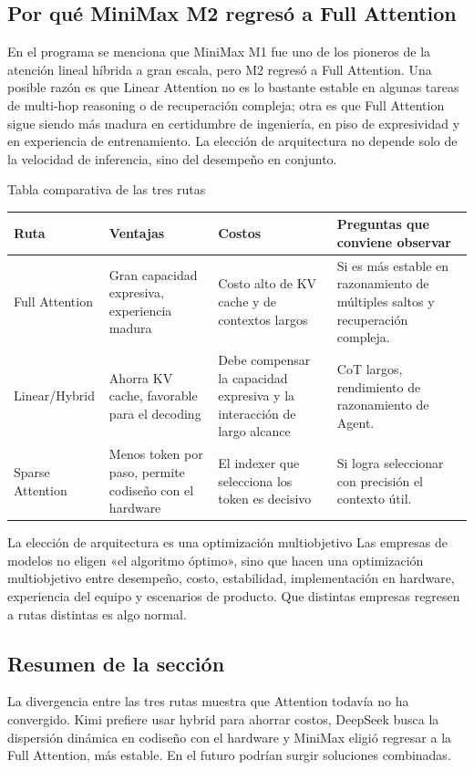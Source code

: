 \subsection{Por qué MiniMax M2 regresó a Full Attention}

En el programa se menciona que MiniMax M1 fue uno de los pioneros de la atención lineal híbrida a gran escala, pero M2 regresó a Full Attention. Una posible razón es que Linear Attention no es lo bastante estable en algunas tareas de multi-hop reasoning o de recuperación compleja; otra es que Full Attention sigue siendo más madura en certidumbre de ingeniería, en piso de expresividad y en experiencia de entrenamiento. La elección de arquitectura no depende solo de la velocidad de inferencia, sino del desempeño en conjunto.

\begin{knowledgebox}{Tabla comparativa de las tres rutas}
\begin{tabularx}{\textwidth}{p{}p{}p{}X}
\toprule
Ruta & Ventajas & Costos & Preguntas que conviene observar \\
\midrule
Full Attention & Gran capacidad expresiva, experiencia madura & Costo alto de KV cache y de contextos largos & Si es más estable en razonamiento de múltiples saltos y recuperación compleja. \\
Linear/Hybrid & Ahorra KV cache, favorable para el decoding & Debe compensar la capacidad expresiva y la interacción de largo alcance & CoT largos, rendimiento de razonamiento de Agent. \\
Sparse Attention & Menos token por paso, permite codiseño con el hardware & El indexer que selecciona los token es decisivo & Si logra seleccionar con precisión el contexto útil. \\
\bottomrule
\end{tabularx}
\end{knowledgebox}

\begin{importantbox}{La elección de arquitectura es una optimización multiobjetivo}
Las empresas de modelos no eligen «el algoritmo óptimo», sino que hacen una optimización multiobjetivo entre desempeño, costo, estabilidad, implementación en hardware, experiencia del equipo y escenarios de producto. Que distintas empresas regresen a rutas distintas es algo normal.
\end{importantbox}

\subsection{Resumen de la sección}

La divergencia entre las tres rutas muestra que Attention todavía no ha convergido. Kimi prefiere usar hybrid para ahorrar costos, DeepSeek busca la dispersión dinámica en codiseño con el hardware y MiniMax eligió regresar a la Full Attention, más estable. En el futuro podrían surgir soluciones combinadas.
